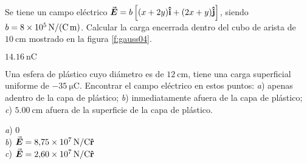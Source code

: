 %
\begin{minipage}[t]{.5\textwidth}
\begin{center}
\end{center}
\end{minipage}
%
\begin{Exercise}\label{p:gauss04}
	Se tiene un campo eléctrico $\va*{E} = b \left [ (x+2y)\vu{i}+(2x+y)\vu{j} \right ]$, siendo $b = \SI{8E5}{\newton/(\coulomb . \metre)}$. Calcular la carga encerrada dentro del cubo de arista de $\SI{10}{\centi\metre}$ mostrado en la figura \ref{f:gauss04}.
\end{Exercise}
\begin{Answer}
	$\SI{14.16}{\nano\coulomb}$
\end{Answer}
%
\begin{Exercise}
	Una esfera de plástico cuyo diámetro es de $\SI{12}{\centi\metre}$, tiene una carga superficial uniforme de $\SI{-35}{\micro\coulomb}$. Encontrar el campo eléctrico en estos puntos: \textit{a}) apenas adentro de la capa de plástico; \textit{b}) inmediatamente afuera de la capa de plástico; \textit{c}) $\SI{5.00}{\centi\metre}$ afuera de la superficie de la capa de plástico.
\end{Exercise}
\begin{Answer}
	\begin{minipage}[t]{.4\textwidth}
		\textit{a}) 0\\ \textit{b}) $\va*{E} = \SI{8.75E7}{\newton/\coulomb}\vu{r}$\\ \textit{c}) $\va*{E} = \SI{2.60E7}{\newton/\coulomb}\vu{r}$
	\end{minipage}
\end{Answer}
